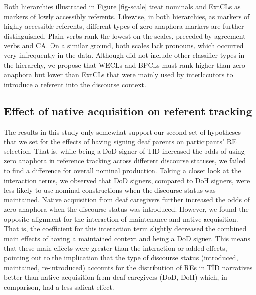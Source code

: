 \documentclass[review]{elsarticle} %
\begin{document}
Both hierarchies illustrated in Figure \ref{fig-scale} treat nominals
and ExtCLs as markers of lowly accessibly referents. Likewise, in both
hierarchies, as markers of highly accessible referents, different types
of zero anaphora markers are further distinguished. Plain verbs rank the
lowest on the scales, preceded by agreement verbs and CA. On a similar
ground, both scales lack pronouns, which occurred very infrequently in
the data. Although \citet{frederiksen2016} did not include other
classifier types in the hierarchy, we propose that WECLs and BPCLs must
rank higher than zero anaphora but lower than ExtCLs that were mainly
used by interlocutors to introduce a referent into the discourse
context.

\hypertarget{effect-of-native-acquisition-on-referent-tracking}{%
\subsection{Effect of native acquisition on referent
tracking}\label{effect-of-native-acquisition-on-referent-tracking}}

The results in this study only somewhat support our second set of
hypotheses that we set for the effects of having signing deaf parents on
participants' RE selection. That is, while being a DoD signer of TİD
increased the odds of using zero anaphora in reference tracking across
different discourse statuses, we failed to find a difference for overall
nominal production. Taking a closer look at the interaction terms, we
observed that DoD signers, compared to DoH signers, were less likely to
use nominal constructions when the discourse status was maintained.
Native acquisition from deaf caregivers further increased the odds of
zero anaphora when the discourse status was introduced. However, we
found the opposite alignment for the interaction of maintenance and
native acquisition. That is, the coefficient for this interaction term
slightly decreased the combined main effects of having a maintained
context and being a DoD signer. This means that these main effects were
greater than the interaction or added effects, pointing out to the
implication that the type of discourse status (introduced, maintained,
re-introduced) accounts for the distribution of REs in TİD narratives
better than native acquisition from deaf caregivers (DoD, DoH) which, in
comparison, had a less salient effect.
\end{document}

